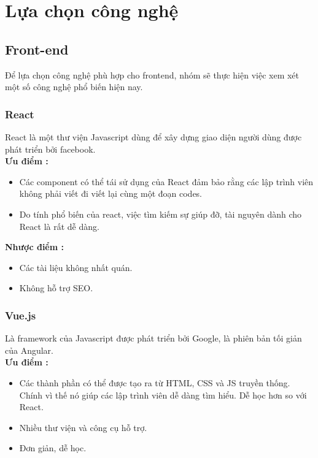 
\section{Lựa chọn công nghệ}
\subsection{Front-end}
Để lựa chọn công nghệ phù hợp cho frontend, nhóm sẽ thực hiện việc xem xét một số công nghệ phổ biến hiện nay.

\subsubsection{React}
\hspace*{0.5cm} React là một thư viện Javascript dùng để xây dựng giao diện người dùng được phát triển bởi facebook.\\

\textbf{Ưu điểm \cite{technologyFE}:}
\begin{itemize}
    \item Các component có thể tái sử dụng của React đảm bảo rằng các lập trình viên không phải viết đi viết lại cùng một đoạn codes.
    \item Do tính phổ biến của react, việc tìm kiếm sự giúp đỡ, tài nguyên dành cho React là rất dễ dàng.
\end{itemize}

\textbf{Nhược điểm \cite{technologyFE}:}
\begin{itemize}
    \item Các tài liệu không nhất quán.
    \item Không hỗ trợ SEO.
\end{itemize}

\subsubsection{Vue.js}

\hspace*{0.5cm} Là framework của Javascript được phát triển bởi Google, là phiên bản tối giản của Angular.    \\


\textbf{Ưu điểm \cite{technologyFE}:}
\begin{itemize}
    \item Các thành phần có thể được tạo ra từ HTML, CSS và JS truyền thống. Chính vì thế nó giúp các lập trình viên dễ dàng tìm hiểu. Dễ học hơn so với React.
    \item Nhiều thư viện và công cụ hỗ trợ.
    \item Đơn giản, dễ học.
\end{itemize}

